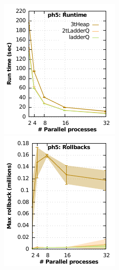 \begin{figure}
  \begin{minipage}{\linewidth}
    \begin{minipage}{0.49\linewidth}
      \includegraphics[width=\linewidth]{images/ph5_Delay_1_Evt_2_run_time}
    \end{minipage}
    \begin{minipage}{0.49\linewidth}
      \includegraphics[width=\linewidth]{images/ph5_Delay_1_Evt_2_rollbacks}

\end{minipage}
\end{minipage}
\end{figure}
